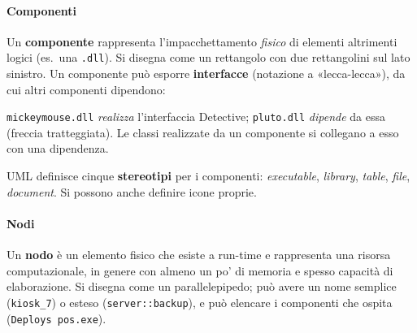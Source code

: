 \documentclass[a4paper,12pt]{article}
\begin{document}
\paragraph{Componenti}
Un \textbf{componente} rappresenta l'impacchettamento \emph{fisico} di elementi
altrimenti logici (es.\ una \texttt{.dll}). Si disegna come un rettangolo con due
rettangolini sul lato sinistro. Un componente può esporre \textbf{interfacce}
(notazione a «lecca-lecca»), da cui altri componenti dipendono:
\begin{center}
\end{center}
\texttt{mickeymouse.dll} \emph{realizza} l'interfaccia \textsf{Detective};
\texttt{pluto.dll} \emph{dipende} da essa (freccia tratteggiata). Le classi realizzate
da un componente si collegano a esso con una dipendenza.

UML definisce cinque \textbf{stereotipi} per i componenti: \emph{executable},
\emph{library}, \emph{table}, \emph{file}, \emph{document}. Si possono anche definire
icone proprie.

\paragraph{Nodi}
Un \textbf{nodo} è un elemento fisico che esiste a run-time e rappresenta una risorsa
computazionale, in genere con almeno un po' di memoria e spesso capacità di
elaborazione. Si disegna come un parallelepipedo; può avere un nome semplice
(\texttt{kiosk\_7}) o esteso (\texttt{server::backup}), e può elencare i componenti che
ospita (\texttt{Deploys pos.exe}).
\begin{center}
\end{center}
\end{document}
